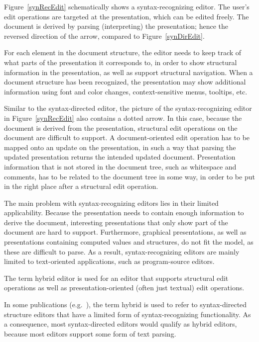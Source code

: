 Figure~\ref{synRecEdit} schematically shows a syntax-recognizing editor. The user's edit operations are targeted at the presentation, which can be edited freely. The document is derived by parsing (interpreting) the presentation; hence the reversed direction of the arrow, compared to Figure~\ref{synDirEdit}.

For each element in the document structure, the editor needs to keep track of what parts of the presentation it corresponds to, in order to show structural information in the presentation, as well as support structural navigation.  When a document structure has been recognized, the presentation may show additional information using font and color changes, context-sensitive menus, tooltips, etc.

Similar to the syntax-directed editor, the picture of the syntax-recognizing editor in Figure~\ref{synRecEdit} also contains a dotted arrow. In this case, because the document is derived from the presentation, structural edit operations on the document are difficult to support. A document-oriented edit operation has to be mapped onto an update on the presentation, in such a way that parsing the updated presentation returns the intended updated document. Presentation information that is not stored in the document tree, such as whitespace and comments, has to be related to the document tree in some way, in order to be put in the right place after a structural edit operation.

The main problem with syntax-recognizing editors lies in their limited applicability. Because the presentation needs to contain enough information to derive the document, interesting presentations that only show part of the document are hard to support. Furthermore, graphical presentations, as well as presentations containing computed values and structures, do not fit the model, as these are difficult to parse. As a result, syntax-recognizing editors are mainly limited to text-oriented applications, such as program-source editors.


The term hybrid editor is used for an editor that supports structural edit operations as well as presentation-oriented (often just textual) edit operations.

In some publications (e.g.~\cite{teitelbaum81progSynth, minor90editing}), the term hybrid is used to refer to syntax-directed structure editors that have a limited form of syntax-recognizing functionality. As a consequence, most syntax-directed editors would qualify as hybrid editors, because most editors support some form of text parsing.

